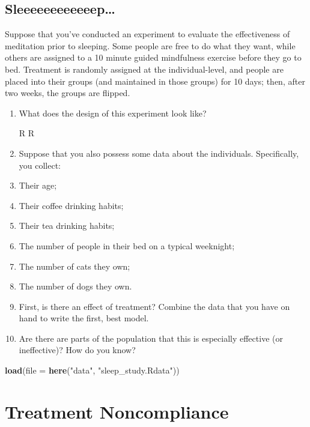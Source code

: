 \documentclass[
]{article}
\newenvironment{Shaded}{\begin{snugshade}}{\end{snugshade}}
\newcommand{\AttributeTok}[1]{\textcolor[rgb]{0.13,0.29,0.53}{#1}}
\newcommand{\FunctionTok}[1]{\textcolor[rgb]{0.13,0.29,0.53}{\textbf{#1}}}
\newcommand{\NormalTok}[1]{#1}
\newcommand{\StringTok}[1]{\textcolor[rgb]{0.31,0.60,0.02}{#1}}
\theoremstyle{definition}
\theoremstyle{definition}
\theoremstyle{definition}
\theoremstyle{definition}
\theoremstyle{remark}
\begin{document}
\subsection{Sleeeeeeeeeeeep\ldots{}}\label{sleeeeeeeeeeeep}

Suppose that you've conducted an experiment to evaluate the effectiveness of meditation prior to sleeping. Some people are free to do what they want, while others are assigned to a 10 minute guided mindfulness exercise before they go to bed. Treatment is randomly assigned at the individual-level, and people are placed into their groups (and maintained in those groups) for 10 days; then, after two weeks, the groups are flipped.

\begin{enumerate}
\def\labelenumi{\arabic{enumi}.}
\item
  What does the design of this experiment look like?

  R
  R
\item
  Suppose that you also possess some data about the individuals. Specifically, you collect:
\item
  Their age;
\item
  Their coffee drinking habits;
\item
  Their tea drinking habits;
\item
  The number of people in their bed on a typical weeknight;
\item
  The number of cats they own;
\item
  The number of dogs they own.
\item
  First, is there an effect of treatment? Combine the data that you have on hand to write the first, best model.
\item
  Are there are parts of the population that this is especially effective (or ineffective)? How do you know?
\end{enumerate}

\begin{Shaded}
\begin{Highlighting}[]
\FunctionTok{load}\NormalTok{(}\AttributeTok{file =} \FunctionTok{here}\NormalTok{(}\StringTok{"data"}\NormalTok{, }\StringTok{"sleep\_study.Rdata"}\NormalTok{))}
\end{Highlighting}
\end{Shaded}

\section{Treatment Noncompliance}\label{treatment-noncompliance}
\end{document}
